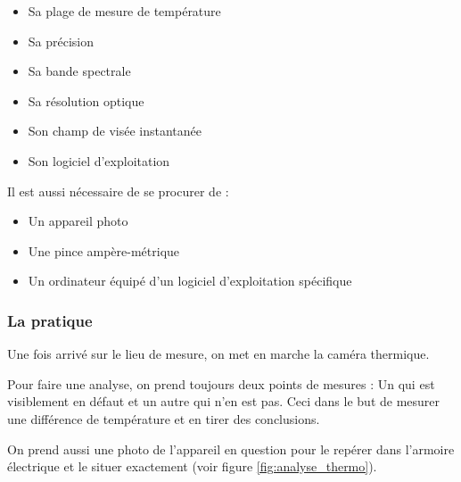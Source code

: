 \begin{itemize}
\item Sa plage de mesure de température
\item Sa précision
\item Sa bande spectrale
\item Sa résolution optique
\item Son champ de visée instantanée%
\item Son logiciel d'exploitation

\end{itemize}
Il est  aussi  nécessaire de se procurer de :  
 
 \begin{itemize}
 
\item Un appareil photo
\item Une pince ampère-métrique
\item Un ordinateur équipé d'un logiciel d'exploitation spécifique \end{itemize}
\subsubsection{La pratique}
Une fois arrivé sur le lieu de mesure, on met en marche la caméra thermique. 

Pour faire une analyse, on prend toujours deux points de mesures : Un qui est visiblement en défaut et un autre qui n'en est pas. Ceci dans le but de mesurer une différence de température et en tirer des conclusions.       

On prend aussi une photo de l'appareil en question pour le repérer dans l'armoire électrique et le situer exactement (voir figure \ref{fig:analyse_thermo}).

